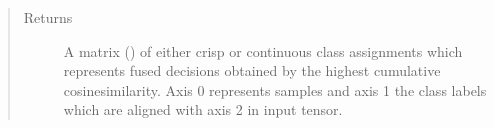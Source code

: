 \documentclass[letterpaper,10pt,english]{sphinxmanual}
\begin{document}
\begin{fulllineitems}
\begin{fulllineitems}
\begin{quote}
\begin{description}
\item[{Returns}] \leavevmode
\sphinxAtStartPar
A matrix () of either crisp or continuous class assignments which represents fused
decisions obtained by the highest cumulative cosine\sphinxhyphen{}similarity. Axis 0 represents samples and axis 1 the
class labels which are aligned with axis 2 in  input tensor.

\end{description}\end{quote}

\end{fulllineitems}


\end{fulllineitems}

\end{document}
